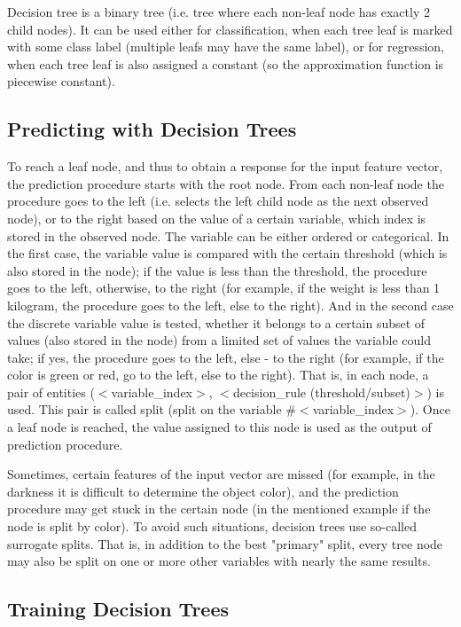 Decision tree is a binary tree (i.e. tree where each non-leaf node has exactly 2 child nodes). It can be used either for classification, when each tree leaf is marked with some class label (multiple leafs may have the same label), or for regression, when each tree leaf is also assigned a constant (so the approximation function is piecewise constant).

\subsection{Predicting with Decision Trees}

To reach a leaf node, and thus to obtain a response for the input feature vector, the prediction procedure starts with the root node. From each non-leaf node the procedure goes to the left (i.e. selects the left child node as the next observed node), or to the right based on the value of a certain variable, which index is stored in the observed node. The variable can be either ordered or categorical. In the first case, the variable value is compared with the certain threshold (which is also stored in the node); if the value is less than the threshold, the procedure goes to the left, otherwise, to the right (for example, if the weight is less than 1 kilogram, the procedure goes to the left, else to the right). And in the second case the discrete variable value is tested, whether it belongs to a certain subset of values (also stored in the node) from a limited set of values the variable could take; if yes, the procedure goes to the left, else - to the right (for example, if the color is green or red, go to the left, else to the right). That is, in each node, a pair of entities ($<$variable\_index$>$, $<$decision\_rule (threshold/subset)$>$) is used. This pair is called split (split on the variable \#$<$variable\_index$>$). Once a leaf node is reached, the value assigned to this node is used as the output of prediction procedure.

Sometimes, certain features of the input vector are missed (for example, in the darkness it is difficult to determine the object color), and the prediction procedure may get stuck in the certain node (in the mentioned example if the node is split by color). To avoid such situations, decision trees use so-called surrogate splits. That is, in addition to the best "primary" split, every tree node may also be split on one or more other variables with nearly the same results.

\subsection{Training Decision Trees}

